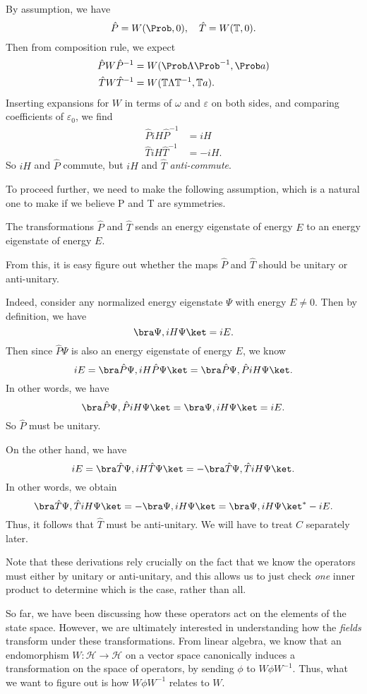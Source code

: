 \documentclass[a4paper]{article}
\begin{document}
By assumption, we have
\[
  \hat{P} = W(\Prob, 0),\quad \hat{T} = W(\mathbb{T}, 0).
\]
Then from composition rule, we expect
\begin{align*}
  \hat{P} W \hat{P}^{-1} &= W(\Prob \Lambda \Prob^{-1}, \Prob a)\\
  \hat{T} W \hat{T}^{-1} &= W(\mathbb{T} \Lambda \mathbb{T}^{-1}, \mathbb{T} a).
\end{align*}
Inserting expansions for $W$ in terms of $\omega$ and $\varepsilon$ on both sides, and comparing coefficients of $\varepsilon_0$, we find
\begin{align*}
  \hat{P} i H \hat{P}^{-1} &= iH\\
  \hat{T} iH \hat{T}^{-1} &= -iH.
\end{align*}
So $iH$ and $\hat{P}$ commute, but $iH$ and $\hat{T}$ \emph{anti-commute}.

To proceed further, we need to make the following assumption, which is a natural one to make if we believe P and T are symmetries.
\begin{assumption}
  The transformations $\hat{P}$ and $\hat{T}$ sends an energy eigenstate of energy $E$ to an energy eigenstate of energy $E$.
\end{assumption}
From this, it is easy figure out whether the maps $\hat{P}$ and $\hat{T}$ should be unitary or anti-unitary.

Indeed, consider any normalized energy eigenstate $\Psi$ with energy $E \not = 0$. Then by definition, we have
\[
  \bra \Psi, i H \Psi\ket = iE.
\]
Then since $\hat{P}\Psi$ is also an energy eigenstate of energy $E$, we know
\[
  iE = \bra \hat{P} \Psi, iH \hat{P} \Psi\ket = \bra \hat{P} \Psi, \hat{P} iH \Psi \ket.
\]
In other words, we have
\[
  \bra \hat{P} \Psi, \hat{P} iH \Psi \ket = \bra \Psi, iH \Psi \ket = iE.
\]
So $\hat{P}$ must be unitary.

On the other hand, we have
\[
  iE = \bra \hat{T} \Psi, iH \hat{T} \Psi\ket = -\bra \hat{T} \Psi, \hat{T} iH \Psi \ket.
\]
In other words, we obtain
\[
  \bra \hat{T} \Psi, \hat{T} iH \Psi \ket = -\bra \Psi, iH \Psi \ket = \bra \Psi, iH\Psi\ket^* -iE.
\]
Thus, it follows that $\hat{T}$ must be anti-unitary. We will have to treat $\hat{C}$ separately later.

Note that these derivations rely crucially on the fact that we know the operators must either by unitary or anti-unitary, and this allows us to just check \emph{one} inner product to determine which is the case, rather than all.

So far, we have been discussing how these operators act on the elements of the state space. However, we are ultimately interested in understanding how the \emph{fields} transform under these transformations. From linear algebra, we know that an endomorphism $W: \mathcal{H} \to \mathcal{H}$ on a vector space canonically induces a transformation on the space of operators, by sending $\phi$ to $W\phi W^{-1}$. Thus, what we want to figure out is how $W \phi W^{-1}$ relates to $W$.
\end{document}
